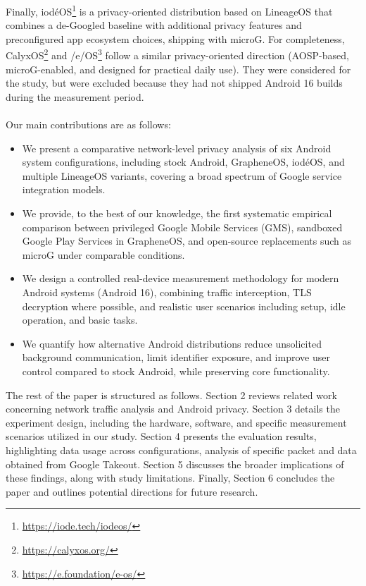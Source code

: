 Finally, iod\'eOS\footnote{\url{https://iode.tech/iodeos/}} is a privacy-oriented distribution based on LineageOS that combines a de-Googled baseline with additional privacy features and preconfigured app ecosystem choices, shipping with microG. For completeness, CalyxOS\footnote{\url{https://calyxos.org/}} and /e/OS\footnote{\url{https://e.foundation/e-os/}} follow a similar privacy-oriented direction (AOSP-based, microG-enabled, and designed for practical daily use). They were considered for the study, but were excluded because they had not shipped Android 16 builds during the measurement period.
\\
\\
\noindent Our main contributions are as follows: 
\begin{itemize}
	\item We present a comparative network-level privacy analysis of six Android system configurations, including stock Android, GrapheneOS, iod\'eOS, and multiple LineageOS variants, covering a broad spectrum of Google service integration models.
	\item We provide, to the best of our knowledge, the first systematic empirical comparison between privileged Google Mobile Services (GMS), sandboxed Google Play Services in GrapheneOS, and open-source replacements such as microG under comparable conditions.
	\item We design a controlled real-device measurement methodology for modern Android systems (Android 16), combining traffic interception, TLS decryption where possible, and realistic user scenarios including setup, idle operation, and basic tasks.
	\item We quantify how alternative Android distributions reduce unsolicited background communication, limit identifier exposure, and improve user control compared to stock Android, while preserving core functionality.
\end{itemize}

The rest of the paper is structured as follows. Section 2 reviews related work concerning network traffic analysis and Android privacy. Section 3 details the experiment design, including the hardware, software, and specific measurement scenarios utilized in our study. Section 4 presents the evaluation results, highlighting data usage across configurations, analysis of specific packet and data obtained from Google Takeout. Section 5 discusses the broader implications of these findings, along with study limitations. Finally, Section 6 concludes the paper and outlines potential directions for future research.
